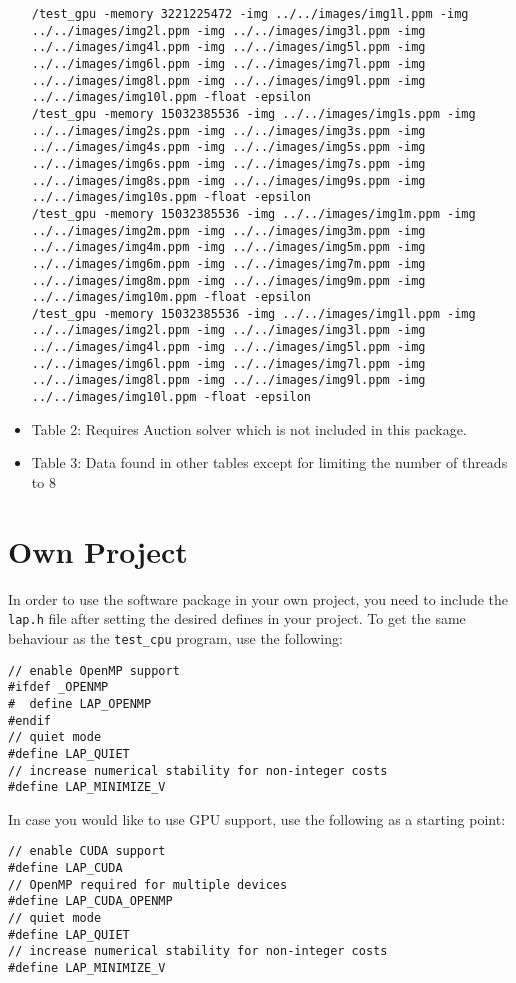 \documentclass[format=acmsmall,review=false, screen=true]{acmart}
\begin{document}
\begin{itemize}
{\texttt{/test\_gpu -memory 3221225472 -img ../../images/img1l.ppm -img ../../images/img2l.ppm -img ../../images/img3l.ppm -img ../../images/img4l.ppm -img ../../images/img5l.ppm -img ../../images/img6l.ppm -img ../../images/img7l.ppm -img ../../images/img8l.ppm -img ../../images/img9l.ppm -img ../../images/img10l.ppm -float -epsilon}\\
\texttt{/test\_gpu -memory 15032385536 -img ../../images/img1s.ppm -img ../../images/img2s.ppm -img ../../images/img3s.ppm -img ../../images/img4s.ppm -img ../../images/img5s.ppm -img ../../images/img6s.ppm -img ../../images/img7s.ppm -img ../../images/img8s.ppm -img ../../images/img9s.ppm -img ../../images/img10s.ppm -float -epsilon}\\
\texttt{/test\_gpu -memory 15032385536 -img ../../images/img1m.ppm -img ../../images/img2m.ppm -img ../../images/img3m.ppm -img ../../images/img4m.ppm -img ../../images/img5m.ppm -img ../../images/img6m.ppm -img ../../images/img7m.ppm -img ../../images/img8m.ppm -img ../../images/img9m.ppm -img ../../images/img10m.ppm -float -epsilon}\\
\texttt{/test\_gpu -memory 15032385536 -img ../../images/img1l.ppm -img ../../images/img2l.ppm -img ../../images/img3l.ppm -img ../../images/img4l.ppm -img ../../images/img5l.ppm -img ../../images/img6l.ppm -img ../../images/img7l.ppm -img ../../images/img8l.ppm -img ../../images/img9l.ppm -img ../../images/img10l.ppm -float -epsilon}}
\item Table 2: Requires Auction solver which is not included in this package.
\item Table 3: Data found in other tables except for limiting the number of threads to 8
\end{itemize}

\section{Own Project}
In order to use the software package in your own project, you need to include the \texttt{lap.h} file after setting the desired defines in your project. To get the same behaviour as the \texttt{test\_cpu}  program, use the following:
\begin{verbatim}
// enable OpenMP support
#ifdef _OPENMP
#  define LAP_OPENMP
#endif
// quiet mode
#define LAP_QUIET
// increase numerical stability for non-integer costs
#define LAP_MINIMIZE_V
\end{verbatim}
In case you would like to use GPU support, use the following as a starting point:
\begin{verbatim}
// enable CUDA support
#define LAP_CUDA
// OpenMP required for multiple devices
#define LAP_CUDA_OPENMP
// quiet mode
#define LAP_QUIET
// increase numerical stability for non-integer costs
#define LAP_MINIMIZE_V
\end{verbatim}
\end{document}
